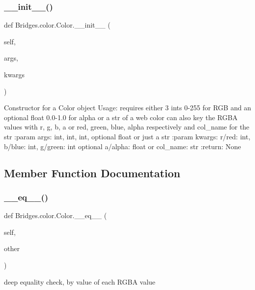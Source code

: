 \subsubsection{\texorpdfstring{\+\_\+\+\_\+init\+\_\+\+\_\+()}{\_\_init\_\_()}}
{\footnotesize\ttfamily def Bridges.\+color.\+Color.\+\_\+\+\_\+init\+\_\+\+\_\+ (\begin{DoxyParamCaption}\item[{}]{self,  }\item[{}]{args,  }\item[{}]{kwargs }\end{DoxyParamCaption})}

\begin{DoxyVerb}Constructor for a Color object
Usage: requires either 3 ints 0-255 for RGB and an optional float 0.0-1.0 for alpha or a str of a web color
can also key the RGBA values with r, g, b, a or red, green, blue, alpha respectively and col_name for the str
:param args: int, int, int, optional float or just a str
:param kwargs: r/red: int, b/blue: int, g/green: int optional a/alpha: float or col_name: str
:return: None
\end{DoxyVerb}
 

\subsection{Member Function Documentation}
\mbox{\label{class_bridges_1_1color_1_1_color_a46bc7ca0a13c2c3152a81d82593fee7e}} 
\subsubsection{\texorpdfstring{\+\_\+\+\_\+eq\+\_\+\+\_\+()}{\_\_eq\_\_()}}
{\footnotesize\ttfamily def Bridges.\+color.\+Color.\+\_\+\+\_\+eq\+\_\+\+\_\+ (\begin{DoxyParamCaption}\item[{}]{self,  }\item[{}]{other }\end{DoxyParamCaption})}

\begin{DoxyVerb}deep equality check, by value of each RGBA value\end{DoxyVerb}
 \mbox{\label{class_bridges_1_1color_1_1_color_a4c9ef08c6ca50f58d6b581dbba1d7ff5}} 
